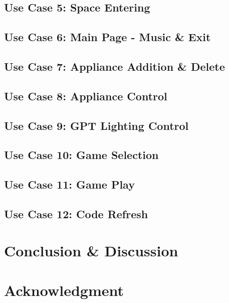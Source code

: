 \documentclass[conference]{IEEEtran}
\begin{document}
    \subsection{Use Case 5: Space Entering}
    \subsection{Use Case 6: Main Page - Music \& Exit}
    \subsection{Use Case 7: Appliance Addition \& Delete}
    \subsection{Use Case 8: Appliance Control}
    \subsection{Use Case 9: GPT Lighting Control}
    \subsection{Use Case 10: Game Selection}
    \subsection{Use Case 11: Game Play}
    \subsection{Use Case 12: Code Refresh}
\section{Conclusion \& Discussion}

\section*{Acknowledgment}
\end{document}
